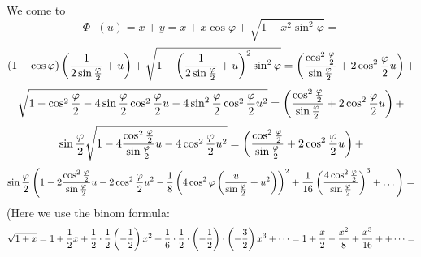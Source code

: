 We come to
       $$
\Phi_+(u)=x+y=
x+x\cos\varphi+\sqrt {1-x^2\sin^2\varphi}=
       $$
      $$
(1+\cos\varphi)
         \left(
{1\over 2\sin {\varphi\over 2}}+u
         \right)
            +
  \sqrt{1-\left(
{1\over 2\sin {\varphi\over 2}}+u
         \right)^2\sin^2\varphi
}=
   \left({\cos^2{\varphi\over 2}\over \sin{\varphi\over 2}}
     +
2\cos^2{\varphi\over 2}u\right)+
      $$
      $$
\sqrt {
    1-\cos^2{\varphi\over 2}-
       4\sin{\varphi\over 2}
     \cos^2{\varphi\over 2}u-
       4\sin^2{\varphi\over 2}
     \cos^2{\varphi\over 2}u^2
      }=
   \left({\cos^2{\varphi\over 2}\over \sin{\varphi\over 2}}
     +
2\cos^2{\varphi\over 2}u\right)+
      $$
         $$
\sin {\varphi\over 2}
 \sqrt 
      {
    1- 
      4
     {\cos^2{\varphi\over 2}
          \over\sin{\varphi\over 2}
               }u-
       4
     \cos^2{\varphi\over 2}u^2
     }=
   \left({\cos^2{\varphi\over 2}\over \sin{\varphi\over 2}}
     +
2\cos^2{\varphi\over 2}u\right)+
         $$
       $$
\sin {\varphi\over 2}
        \left
           ( 
    1- 
        2
     {\cos^2{\varphi\over 2}
          \over\sin{\varphi\over 2}
               }u-
       2
     \cos^2{\varphi\over 2}u^2
           -
     {1\over 8}
            \left(
        4\cos^2\varphi
        \left({u\over \sin {\varphi\over 2}}+u^2\right)
       \right)^2  +{1\over 16}\left(4\cos^2{\varphi\over 2}\over 
      \sin{\varphi\over 2}\right)^3+\dots
          \right)=
        $$
       $$
       $$
(Here we use the binom formula:
     $$
\sqrt {1+x}=1+{1\over 2}x+
{1\over 2}\cdot {1\over 2}\left(-{1\over 2}\right)x^2+
{1\over 6}\cdot {1\over 2}\cdot \left(-{1\over 2}\right)
  \cdot \left(-{3\over 2}\right)x^3+\dots=
    1+{x\over 2}-{x^2\over 8}+{x^3\over 16}+
 +\dots=
      $$

\bye
